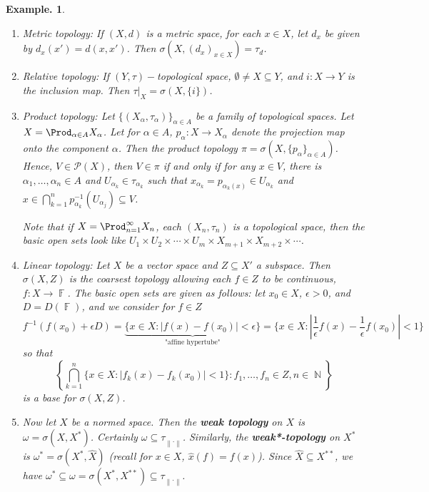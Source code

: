 \documentclass[11pt, a4paper]{memoir}
\DeclareMathOperator{\N}{{\mathbb{N}}}
\DeclareMathOperator{\F}{{\mathbb{F}}}
\newcommand{\norm}[1]{\ensuremath{\left\lVert#1\right\rVert}}
\theoremstyle{change}
\theoremstyle{plain}
\theoremstyle{nonumberplain}
\newtheorem{example}{Example.}
\numberwithin{equation}{section}
\begin{document}
\begin{example}
    \begin{enumerate}[nl,r]
        \item \textit{Metric topology:} If $(X,d)$ is a metric space, for each $x\in X$, let $d_x$ be given by $d_x(x')=d(x,x')$.
            Then $\sigma(X,(d_x)_{x\in X})=\tau_d$.
        \item \textit{Relative topology:} If $(Y,\tau)-$topological space, $\emptyset\neq X\subseteq Y$, and $i:X\to Y$ is the inclusion map.
            Then $\tau|_X=\sigma(X,\{i\})$.
        \item \textit{Product topology:} Let $\{(X_\alpha,\tau_\alpha)\}_{\alpha\in A}$ be a family of topological spaces.
            Let $X=\Prod_{\alpha\in A}X_\alpha$.
            Let for $\alpha\in A$, $p_\alpha:X\to X_\alpha$ denote the projection map onto the component $\alpha$.
            Then the product topology $\pi=\sigma(X,\{p_\alpha\}_{\alpha\in A})$.
            Hence, $V\in\mathcal{P}(X)$, then $V\in\pi$ if and only if for any $x\in V$, there is $\alpha_1,\ldots,\alpha_n\in A$ and $U_{\alpha_k}\in\tau_{\alpha_k}$ such that $x_{\alpha_k}=p_{\alpha_k(x)}\in U_{\alpha_k}$ and $x\in \bigcap_{k=1}^n p_{\alpha_k}^{-1}(U_{\alpha_j})\subseteq V$.

            Note that if $X=\Prod_{n=1}^\infty X_n$, each $(X_n,\tau_n)$ is a topological space, then the basic open sets look like $U_1\times U_2\times\cdots\times U_m\times X_{m+1}\times X_{m+2}\times\cdots$.
        \item \textit{Linear topology:} Let $X$ be a vector space and $Z\subseteq X'$ a subspace.
            Then $\sigma(X,Z)$ is the coarsest topology allowing each $f\in Z$ to be continuous, $f:X\to\F$.
            The basic open sets are given as follows: let $x_0\in X$, $\epsilon>0$, and $D=D(\F)$, and we consider for $f\in Z$
            \begin{equation*}
                f^{-1}(f(x_0)+\epsilon D)=\underbrace{\{x\in X:|f(x)-f(x_0)|<\epsilon\}}_{\text{"affine hypertube"}}=\{x\in X:|\frac{1}{\epsilon}f(x)-\frac{1}{\epsilon}f(x_0)|<1\}
            \end{equation*}
            so that
            \begin{equation*}
                \left\{\bigcap_{k=1}^n\{x\in X:|f_k(x)-f_k(x_0)|<1\}:f_1,\ldots,f_n\in Z,n\in\N\right\}
            \end{equation*}
            is a base for $\sigma(X,Z)$.
        \item Now let $X$ be a normed space.
            Then the \textbf{weak topology} on $X$ is $\omega=\sigma(X,X^*)$.
            Certainly $\omega\subseteq\tau_{\norm{\cdot}}$.
            Similarly, the \textbf{weak*-topology} on $X^*$ is $\omega^*=\sigma(X^*,\hat X)$ (recall for $x\in X$, $\hat x(f)=f(x)$).
            Since $\hat X\subseteq X^{**}$, we have $\omega^*\subseteq\omega=\sigma(X^*,X^{**})\subseteq\tau_{\norm{\cdot}}$.
    \end{enumerate}
\end{example}
\end{document}
